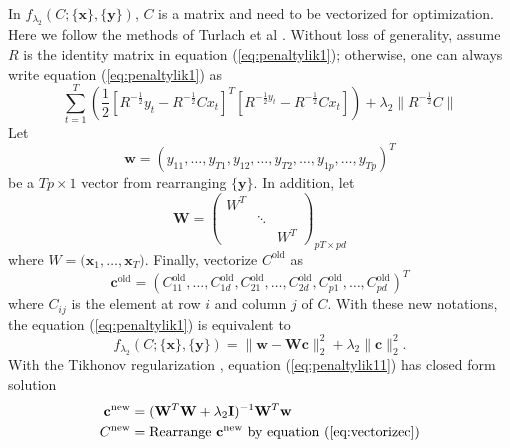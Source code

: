 \documentclass[fleqn]{article}
\let\oldref\ref
\renewcommand{\ref}[1]{(\oldref{#1})}
\newcommand{\T}{T}
\begin{document}
In $f_{\lambda_2}(C;\{\mathbf{x}\},\{\mathbf{y}\})$, $C$ is a matrix and need to be vectorized for optimization. Here we follow the methods of Turlach et al \cite{turlach2005simultaneous}. Without loss of generality, assume $R$ is the identity matrix in equation \ref{eq:penaltylik1}; otherwise, one can always write equation \ref{eq:penaltylik1} as
\begin{equation*}
\sum\limits_{t=1}^{T}\left(\frac{1}{2}[R^{-\frac{1}{2}}y_t-R^{-\frac{1}{2}}Cx_t]^{\T}[R^{-\frac{1}{2}y_t}-R^{-\frac{1}{2}}Cx_t]\right) + \lambda_2 \|R^{-\frac{1}{2}}C\|
\end{equation*}
Let
\begin{equation*}
\mathbf{w} = (y_{11},\ldots,y_{T1},y_{12},\ldots,y_{T2},\ldots,y_{1p},\ldots,y_{Tp})^{\T}
\end{equation*}
be a $Tp\times 1$ vector from rearranging  $\{\mathbf{y}\}$. In addition, let
\[
\mathbf{W} = \begin{pmatrix}
W^{\T}&&\\
&\ddots&\\
&&W^{\T}
\end{pmatrix}_{pT\times pd}
\]
where $W=\biggl(\mathbf{x}_1,\ldots,\mathbf{x}_{T}\biggr)$. Finally, vectorize $C^{\text{old}}$ as
\begin{equation}\label{eq:vectorizec}
\mathbf{c}^{\text{old}} = (C_{11}^{\text{old}},\ldots,C_{1d}^{\text{old}},C_{21}^{\text{old}},\ldots,C_{2d}^{\text{old}},C_{p1}^{\text{old}},\ldots,C_{pd}^{\text{old}})^{\T}
\end{equation}
where $C_{ij}$ is the element at row $i$ and column $j$ of $C$. With these new notations, the equation \ref{eq:penaltylik1} is equivalent to
\begin{equation}\label{eq:penaltylik11}
f_{\lambda_2}(C;\{\mathbf{x}\},\{\mathbf{y}\}) = \|\mathbf{w}  - \mathbf{Wc}\|_2^2 + \lambda_2\|\mathbf{c}\|_2^2.
\end{equation}
With the Tikhonov regularization \cite{tikhonov1943stability}, equation \ref{eq:penaltylik11} has closed form solution
\begin{equation}\label{eq:updatec}
\begin{aligned}
\mathbf{c}^{\text{new}} &= (\mathbf{W}^{\T}\mathbf{W} + \lambda_2\mathbf{I})^{-1}\mathbf{W}^{\T}\mathbf{w}\\
C^{\text{new}} &=\text{Rearrange } \mathbf{c}^{\text{new}} \text{ by equation }\ref{eq:vectorizec}
\end{aligned}
\end{equation}
\end{document}
